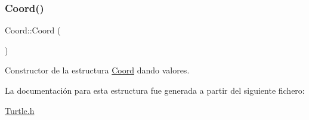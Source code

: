 \subsubsection{\texorpdfstring{Coord()}{Coord()}}
{\footnotesize\ttfamily Coord\+::\+Coord (\begin{DoxyParamCaption}{ }\end{DoxyParamCaption})\hspace{0.3cm}{\ttfamily [inline]}}

Constructor de la estructura \hyperlink{structCoord}{Coord} dando valores. 

La documentación para esta estructura fue generada a partir del siguiente fichero\+:\begin{DoxyCompactItemize}
\item 
\hyperlink{Turtle_8h}{Turtle.\+h}\end{DoxyCompactItemize}
